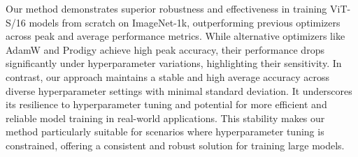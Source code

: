 \begin{table}[!ht]
\caption{Comparison of peak and average top-1 validation accuracy on ImageNet-1k for ViT-S/16 trained from scratch. Each optimizer's performance is evaluated over a hyperparameter search space, reporting the highest accuracy (Peak@top1) and the average accuracy (Avg@top1) across all trials. Results are averaged over three seeds, with standard deviations for statistical analysis. Our method achieves significantly higher robustness to hyperparameter variations, maintaining a high average performance (57.55\%) and outperforming other optimizers by at least 20\%.}
\label{table:vit_results}
\end{table}


Our method demonstrates superior robustness and effectiveness in training ViT-S/16 models from scratch on ImageNet-1k, outperforming previous optimizers across peak and average performance metrics. While alternative optimizers like AdamW and Prodigy achieve high peak accuracy, their performance drops significantly under hyperparameter variations, highlighting their sensitivity. In contrast, our approach maintains a stable and high average accuracy across diverse hyperparameter settings with minimal standard deviation. It underscores its resilience to hyperparameter tuning and potential for more efficient and reliable model training in real-world applications. This stability makes our method particularly suitable for scenarios where hyperparameter tuning is constrained, offering a consistent and robust solution for training large models.

